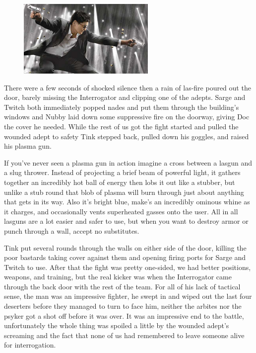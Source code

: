 \begin{figure}
	\begin{center}
		\includegraphics[width=\figwidth]{pics/9/17.png}
	\end{center}
\end{figure}
There were a few seconds of shocked silence then a rain of las-fire poured out the door, barely missing the Interrogator and clipping one of the adepts. 
Sarge and Twitch both immediately popped nades and put them through the building's windows and Nubby laid down some suppressive fire on the doorway, giving Doc the cover he needed. 
While the rest of us got the fight started and pulled the wounded adept to safety Tink stepped back, pulled down his goggles, and raised his plasma gun.

If you've never seen a plasma gun in action imagine a cross between a lasgun and a slug thrower. 
Instead of projecting a brief beam of powerful light, it gathers together an incredibly hot ball of energy then lobs it out like a stubber, but unlike a stub round that blob of plasma will burn through just about anything that gets in its way. 
Also it's bright blue, make's an incredibly ominous whine as it charges, and occasionally vents superheated gasses onto the user. 
All in all lasguns are a lot easier and safer to use, but when you want to destroy armor or punch through a wall, accept no substitutes.

Tink put several rounds through the walls on either side of the door, killing the poor bastards taking cover against them and opening firing ports for Sarge and Twitch to use. 
After that the fight was pretty one-sided, we had better positions, weapons, and training, but the real kicker was when the Interrogator came through the back door with the rest of the team. 
For all of his lack of tactical sense, the man was an impressive fighter, he swept in and wiped out the last four deserters before they managed to turn to face him, neither the arbites nor the psyker got a shot off before it was over. 
It was an impressive end to the battle, unfortunately the whole thing was spoiled a little by the wounded adept's screaming and the fact that none of us had remembered to leave someone alive for interrogation.

